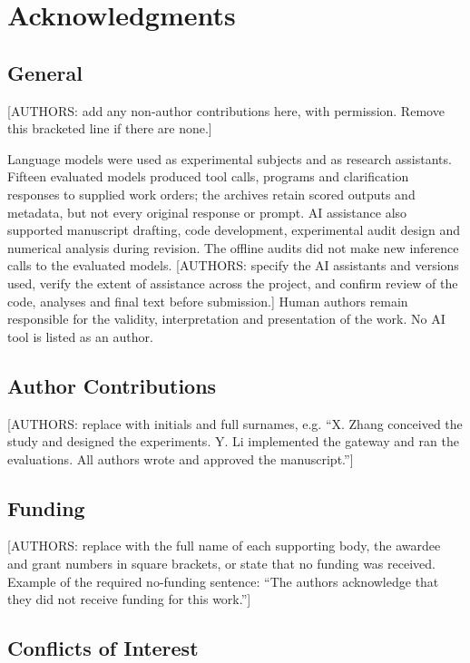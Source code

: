 \section*{Acknowledgments}

\subsection*{General}

[AUTHORS: add any non-author contributions here, with permission. Remove this bracketed line if there are none.]

Language models were used as experimental subjects and as research assistants. Fifteen evaluated models produced tool calls, programs and clarification responses to supplied work orders; the archives retain scored outputs and metadata, but not every original response or prompt. AI assistance also supported manuscript drafting, code development, experimental audit design and numerical analysis during revision. The offline audits did not make new inference calls to the evaluated models. [AUTHORS: specify the AI assistants and versions used, verify the extent of assistance across the project, and confirm review of the code, analyses and final text before submission.] Human authors remain responsible for the validity, interpretation and presentation of the work. No AI tool is listed as an author.

\subsection*{Author Contributions}

[AUTHORS: replace with initials and full surnames, e.g. ``X. Zhang conceived the study and designed the experiments. Y. Li implemented the gateway and ran the evaluations. All authors wrote and approved the manuscript.'']

\subsection*{Funding}

[AUTHORS: replace with the full name of each supporting body, the awardee and grant numbers in square brackets, or state that no funding was received. Example of the required no-funding sentence: ``The authors acknowledge that they did not receive funding for this work.'']

\subsection*{Conflicts of Interest}


